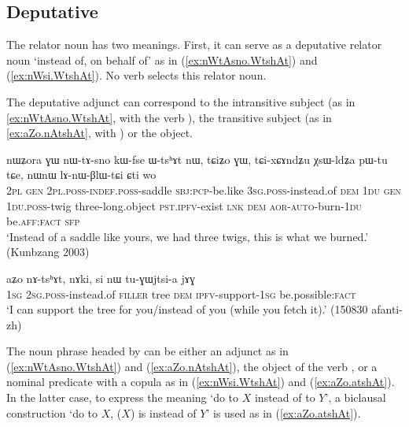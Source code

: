 \subsection{Deputative} \label{sec:deputative} 
The relator noun  has two meanings. First, it can serve as a deputative relator noun `instead of, on behalf of' as in (\ref{ex:nWtAsno.WtshAt}) and (\ref{ex:nWsi.WtshAt}). No verb selects this relator noun. 

The deputative adjunct can correspond to the intransitive subject (as in \ref{ex:nWtAsno.WtshAt}, with the verb ), the transitive subject (as in \ref{ex:aZo.nAtshAt}, with ) or the object.

\begin{exe}
\ex \label{ex:nWtAsno.WtshAt}
\gll nɯʑora ɣɯ nɯ-tɤ-sno kɯ-fse ɯ-tsʰɤt nɯ, tɕiʑo ɣɯ, tɕi-xɕɤndʑu χsɯ-ldʑa pɯ-tu tɕe, nɯnɯ lɤ-nɯ-βlɯ-tɕi ɕti wo \\
\textsc{2pl} \textsc{gen} \textsc{2pl}.\textsc{poss}-\textsc{indef}.\textsc{poss}-saddle \textsc{sbj}:\textsc{pcp}-be.like \textsc{3sg}.\textsc{poss}-instead.of \textsc{dem} \textsc{1du} \textsc{gen} \textsc{1du}.\textsc{poss}-twig three-long.object \textsc{pst}.\textsc{ipfv}-exist \textsc{lnk} \textsc{dem} \textsc{aor}-\textsc{auto}-burn-\textsc{1du} be.\textsc{aff}:\textsc{fact} \textsc{sfp} \\
\glt `Instead of a saddle like yours, we had three twigs, this is what we burned.' (Kunbzang 2003)
\end{exe}

\begin{exe}
\ex \label{ex:aZo.nAtshAt}
\gll aʑo nɤ-tsʰɤt, nɤki, si nɯ tu-ɣɯjtsi-a jɤɣ \\
\textsc{1sg} \textsc{2sg}.\textsc{poss}-instead.of \textsc{filler} tree \textsc{dem} \textsc{ipfv}-support-\textsc{1sg} be.possible:\textsc{fact} \\
\glt `I can support the tree for you/instead of you (while you fetch it).' (150830 afanti-zh)
\end{exe}

 The noun phrase headed by  can be either an adjunct as in (\ref{ex:nWtAsno.WtshAt}) and (\ref{ex:aZo.nAtshAt}), the object of the verb , or a nominal predicate with a copula as in (\ref{ex:nWsi.WtshAt}) and (\ref{ex:aZo.atshAt}).  In the latter case, to express the meaning `do to $X$ instead of to $Y$', a biclausal construction `do to $X$, ($X$) is instead of $Y$' is used as in (\ref{ex:aZo.atshAt}).

